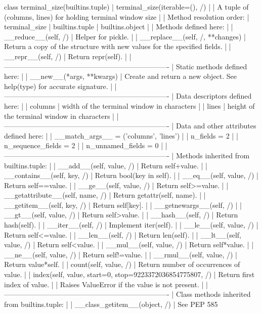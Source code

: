 \documentclass{article}
\begin{document}
    class terminal_size(builtins.tuple)
     |  terminal_size(iterable=(), /)
     |
     |  A tuple of (columns, lines) for holding terminal window size
     |
     |  Method resolution order:
     |      terminal_size
     |      builtins.tuple
     |      builtins.object
     |
     |  Methods defined here:
     |
     |  __reduce__(self, /)
     |      Helper for pickle.
     |
     |  __replace__(self, /, **changes)
     |      Return a copy of the structure with new values for the specified fields.
     |
     |  __repr__(self, /)
     |      Return repr(self).
     |
     |  ----------------------------------------------------------------------
     |  Static methods defined here:
     |
     |  __new__(*args, **kwargs)
     |      Create and return a new object.  See help(type) for accurate signature.
     |
     |  ----------------------------------------------------------------------
     |  Data descriptors defined here:
     |
     |  columns
     |      width of the terminal window in characters
     |
     |  lines
     |      height of the terminal window in characters
     |
     |  ----------------------------------------------------------------------
     |  Data and other attributes defined here:
     |
     |  __match_args__ = ('columns', 'lines')
     |
     |  n_fields = 2
     |
     |  n_sequence_fields = 2
     |
     |  n_unnamed_fields = 0
     |
     |  ----------------------------------------------------------------------
     |  Methods inherited from builtins.tuple:
     |
     |  __add__(self, value, /)
     |      Return self+value.
     |
     |  __contains__(self, key, /)
     |      Return bool(key in self).
     |
     |  __eq__(self, value, /)
     |      Return self==value.
     |
     |  __ge__(self, value, /)
     |      Return self>=value.
     |
     |  __getattribute__(self, name, /)
     |      Return getattr(self, name).
     |
     |  __getitem__(self, key, /)
     |      Return self[key].
     |
     |  __getnewargs__(self, /)
     |
     |  __gt__(self, value, /)
     |      Return self>value.
     |
     |  __hash__(self, /)
     |      Return hash(self).
     |
     |  __iter__(self, /)
     |      Implement iter(self).
     |
     |  __le__(self, value, /)
     |      Return self<=value.
     |
     |  __len__(self, /)
     |      Return len(self).
     |
     |  __lt__(self, value, /)
     |      Return self<value.
     |
     |  __mul__(self, value, /)
     |      Return self*value.
     |
     |  __ne__(self, value, /)
     |      Return self!=value.
     |
     |  __rmul__(self, value, /)
     |      Return value*self.
     |
     |  count(self, value, /)
     |      Return number of occurrences of value.
     |
     |  index(self, value, start=0, stop=9223372036854775807, /)
     |      Return first index of value.
     |
     |      Raises ValueError if the value is not present.
     |
     |  ----------------------------------------------------------------------
     |  Class methods inherited from builtins.tuple:
     |
     |  __class_getitem__(object, /)
     |      See PEP 585
\end{document}
